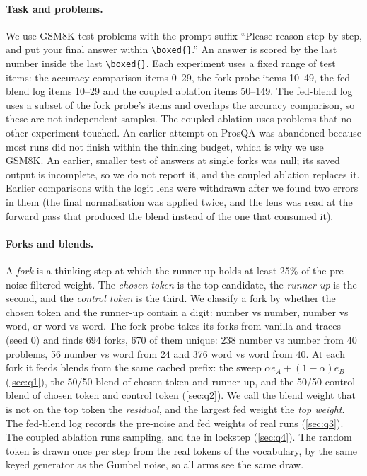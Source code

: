 \paragraph{Task and problems.}
We use GSM8K test problems \cite{cobbe2021gsm8k} with the prompt suffix
``Please reason step by step, and put your final answer within \texttt{\textbackslash boxed\{\}}.''
An answer is scored by the last number inside the last \texttt{\textbackslash boxed\{\}}.
Each experiment uses a fixed range of test items:
the accuracy comparison items 0--29, %
the fork probe items 10--49, %
the fed-blend log items 10--29 %
and the coupled ablation items 50--149. %
The fed-blend log uses a subset of the fork probe's items and overlaps the accuracy comparison, so these are not
independent samples.
The coupled ablation uses problems that no other experiment touched.
An earlier attempt on ProsQA was abandoned because most runs did not finish within the thinking budget, which is why
we use GSM8K.
An earlier, smaller test of answers at single forks was null; its saved output is incomplete, so we do not report it,
and the coupled ablation replaces it.
Earlier comparisons with the logit lens were withdrawn after we found two errors in them (the final normalisation was
applied twice, and the lens was read at the forward pass that produced the blend instead of the one that consumed it).

\paragraph{Forks and blends.}
A \emph{fork} is a thinking step at which the runner-up holds at least 25\% of the pre-noise filtered weight. %
The \emph{chosen token} is the top candidate, the \emph{runner-up} is the second, and the \emph{control token} is
the third.
We classify a fork by whether the chosen token and the runner-up contain a digit:
number vs number, number vs word, or word vs word.
The fork probe takes its forks from vanilla and \GST{} traces (seed 0) and finds 694 forks, 670 of them unique: %
238 number vs number from 40 problems, 56 number vs word from 24 and 376 word vs word from 40. %
At each fork it feeds blends from the same cached prefix: the sweep $\alpha e_A + (1-\alpha) e_B$ (\cref{sec:q1}),
the 50/50 blend of chosen token and runner-up, and the 50/50 control blend of chosen token and control token
(\cref{sec:q2}).
We call the blend weight that is not on the top token the \emph{residual}, and the largest fed weight the
\emph{top weight}.
The fed-blend log records the pre-noise and fed weights of real runs (\cref{sec:q3}).
The coupled ablation runs sampling, \ST{} and the \ctrl{} in lockstep (\cref{sec:q4}).
The random token is drawn once per step from the real tokens of the vocabulary, by the same keyed generator as the
Gumbel noise, so all arms see the same draw.


